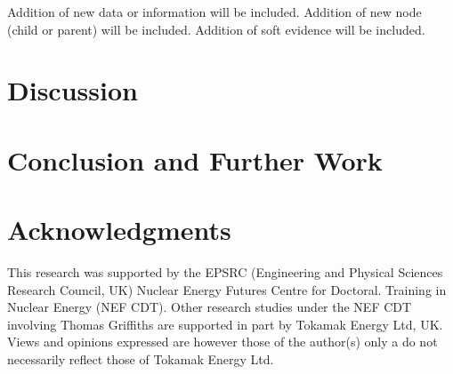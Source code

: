 \documentclass[lettersize,journal]{IEEEtran}
\begin{document}
Addition of new data or information will be included. Addition of new node (child or parent) will be included. Addition of soft evidence will be included.

\section{Discussion}\label{sec:Discussion}


\section{Conclusion and Further Work}\label{sec:conc}


\section{Acknowledgments}
This research was supported by the EPSRC (Engineering and Physical Sciences Research Council, UK) Nuclear Energy Futures Centre for Doctoral. Training in Nuclear Energy (NEF CDT).  Other research studies under the NEF CDT involving Thomas Griffiths are supported in part by Tokamak Energy Ltd, UK. Views and opinions expressed are however those of the author(s) only a do not necessarily reflect those of Tokamak Energy Ltd.

\scriptsize
\scriptsize
\end{document}

